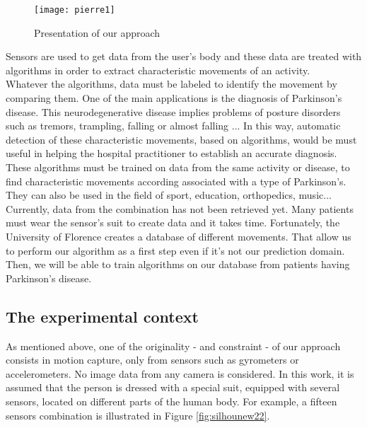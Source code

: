 \documentclass[letterpaper, 10 pt, conference]{ieeeconf}  %
\begin{document}
\begin{figure}[h]
	\begin{center}
		\texttt{[image: pierre1]}
		\caption{Presentation of our approach} 
		\label{fig:silhou}
	\end{center}
\end{figure}
Sensors are used to get data from the user's body and these data are treated with algorithms in order to extract characteristic movements of an activity.\\
Whatever the algorithms, data must be labeled to identify the movement by comparing them. One of the main applications is the diagnosis of Parkinson's disease. This neurodegenerative disease implies problems of posture disorders such as tremors, trampling, falling or almost falling ... In this way, automatic detection of these characteristic movements, based on algorithms, would be must useful in helping the hospital practitioner to establish an accurate diagnosis. These algorithms must be trained on data from the same activity or disease, to find characteristic movements according associated with a type of Parkinson's. 
They can also be used in the field of sport, education, orthopedics, music...\\
Currently, data from the combination has not been retrieved yet. Many patients must wear the sensor's suit to create data and it takes time. Fortunately, the University of Florence \cite{sei13} creates a database of different movements. That allow us to perform our algorithm as a first step even if it's not our prediction domain. Then, we will be able to train algorithms on our database from patients having Parkinson's disease.\\
%
%
%


\subsection{The experimental context}

As mentioned above, one of the originality - and constraint - of our approach consists in motion capture, only from sensors such as gyrometers or accelerometers. No image data from any camera is considered. In this work, it is assumed that the person is dressed with a special suit, equipped with several sensors, located on different parts of the human body. For example, a fifteen sensors combination is illustrated in Figure \ref{fig:silhounew22}.
\end{document}
